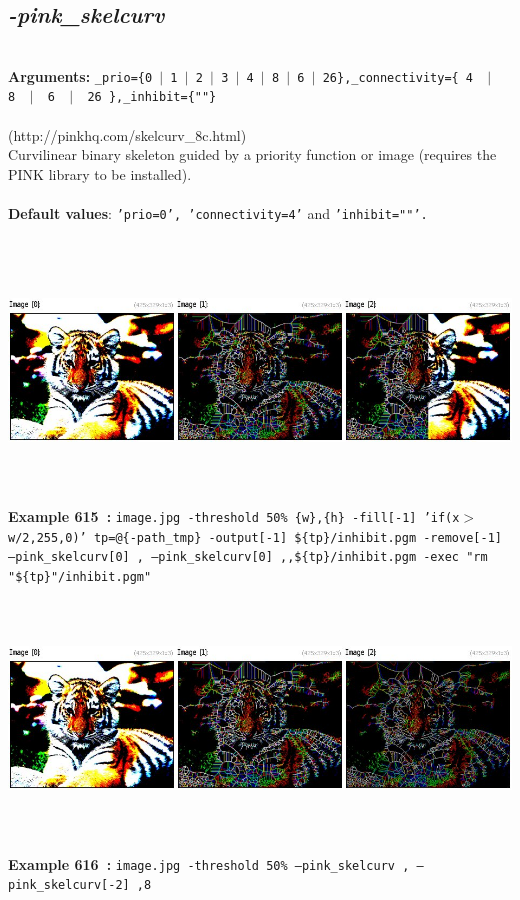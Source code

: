 \documentclass[a4paper,11pt,twoside]{book}
\begin{document}
\subsection{\emph{-pink\_skelcurv} }\vspace*{-0.5em}
~\\\textbf{Arguments: } 
{\small \texttt{\_prio=\{0~$|$~1~$|$~2~$|$~3~$|$~4~$|$~8~$|$~6~$|$~26\},\_connectivity=\{ 4 ~$|$~ 8 ~$|$~ 6 ~$|$~ 26 \},\_inhibit=\{""\}}}\\~\\
(http://pinkhq.com/skelcurv\_8c.html)
~\\Curvilinear binary skeleton guided by a priority function or image (requires the PINK library to be installed).
~\\~\\\textbf{Default values}: {\small \texttt{'prio=0', 'connectivity=4'} and \texttt{'inhibit=""'.}}
\begin{center}\includegraphics[keepaspectratio=true,height=7cm,width=\textwidth]{img/gmic_def615.jpg}\\
{\footnotesize \textbf{Example 615~:} \texttt{image.jpg -threshold 50\% \{w\},\{h\} -fill[-1] 'if(x$>$w/2,255,0)' tp=@\{-path\_tmp\} -output[-1] \$\{tp\}/inhibit.pgm -remove[-1] --pink\_skelcurv[0] , --pink\_skelcurv[0] ,,\$\{tp\}/inhibit.pgm -exec "rm "\$\{tp\}"/inhibit.pgm"}}
\\\includegraphics[keepaspectratio=true,height=7cm,width=\textwidth]{img/gmic_def616.jpg}\\
{\footnotesize \textbf{Example 616~:} \texttt{image.jpg -threshold 50\% --pink\_skelcurv , --pink\_skelcurv[-2] ,8}}
\end{center}
\end{document}

